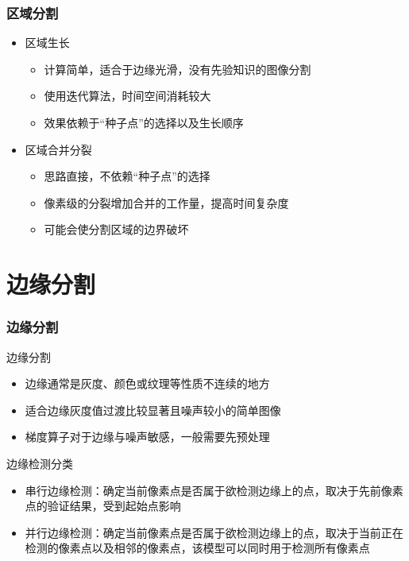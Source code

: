 \documentclass[notheorems,mathserif,table,compress]{beamer}  %
\begin{document}
\begin{frame}
  \frametitle{区域分割}
   \begin{itemize}
   \item 区域生长
         \begin{itemize}
         \item 计算简单，适合于边缘光滑，没有先验知识的图像分割
         \item 使用迭代算法，时间空间消耗较大
         \item 效果依赖于“种子点”的选择以及生长顺序
         \end{itemize}
   \item 区域合并分裂
         \begin{itemize}
         \item 思路直接，不依赖“种子点”的选择
         \item 像素级的分裂增加合并的工作量，提高时间复杂度
         \item 可能会使分割区域的边界破坏
         \end{itemize}         
   \end{itemize}
\end{frame}

\section{边缘分割}
\begin{frame}
  \frametitle{边缘分割}
   边缘分割
   \begin{itemize}
   \item 边缘通常是灰度、颜色或纹理等性质不连续的地方
   \item 适合边缘灰度值过渡比较显著且噪声较小的简单图像
   \item 梯度算子对于边缘与噪声敏感，一般需要先预处理
   \end{itemize}
   边缘检测分类
   \begin{itemize}
   \item 串行边缘检测：确定当前像素点是否属于欲检测边缘上的点，取决于先前像素点的验证结果，受到起始点影响
   \item 并行边缘检测：确定当前像素点是否属于欲检测边缘上的点，取决于当前正在检测的像素点以及相邻的像素点，该模型可以同时用于检测所有像素点
   \end{itemize}
\end{frame}
\end{document}
